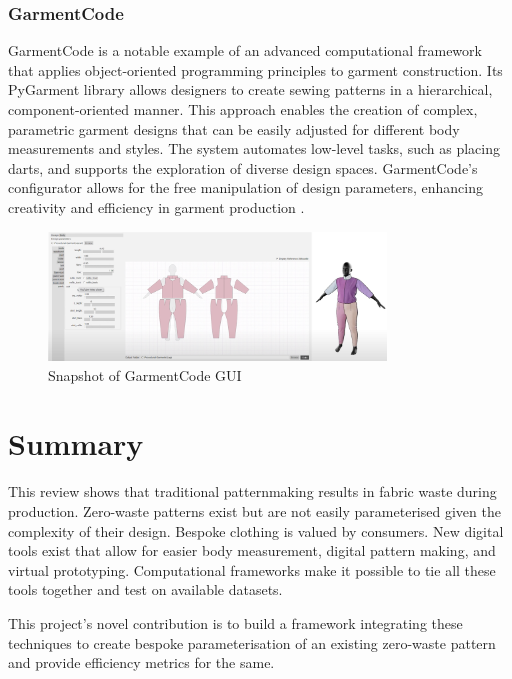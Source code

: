 \subsubsection{GarmentCode}
GarmentCode is a notable example of an advanced computational framework that applies object-oriented programming principles to garment construction. Its PyGarment library allows designers to create sewing patterns in a hierarchical, component-oriented manner. This approach enables the creation of complex, parametric garment designs that can be easily adjusted for different body measurements and styles. The system automates low-level tasks, such as placing darts, and supports the exploration of diverse design spaces. GarmentCode's configurator allows for the free manipulation of design parameters, enhancing creativity and efficiency in garment production \cite{korosteleva_garmentcode_2023}.
\begin{figure} [H]
    \centering
    \includegraphics[width=0.8\textwidth]{Images/pygarment.png}
    \caption{Snapshot of GarmentCode GUI \cite{korosteleva_garmentcode_2023}}
\end{figure}

\section{Summary}
This review shows that traditional patternmaking results in fabric waste during production. Zero-waste patterns exist but are not easily parameterised given the complexity of their design. Bespoke clothing is valued by consumers. New digital tools exist that allow for easier body measurement, digital pattern making, and virtual prototyping. Computational frameworks make it possible to tie all these tools together and test on available datasets.

This project's novel contribution is to build a framework integrating these techniques to create bespoke parameterisation of an existing zero-waste pattern and provide efficiency metrics for the same.